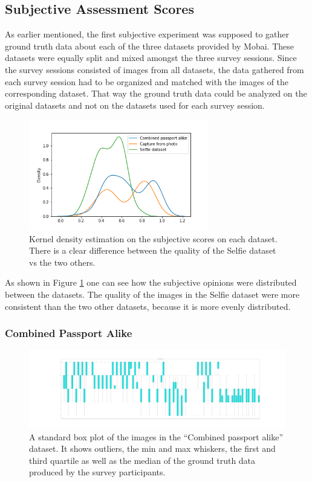 \subsection{Subjective Assessment Scores}
As earlier mentioned, the first subjective experiment was supposed to gather ground truth data about each of the three datasets provided by Mobai. These datasets were equally split and mixed amongst the three survey sessions. Since the survey sessions consisted of images from all datasets, the data gathered from each survey session had to be organized and matched with the images of the corresponding dataset. That way the ground truth data could be analyzed on the original datasets and not on the datasets used for each survey session.

\begin{figure}[h]
    \centering
    \includegraphics[width=0.7\textwidth]{figures/KernelPlots.png}
    \caption{Kernel density estimation on the subjective scores on each dataset. There is a clear difference between the quality of the Selfie dataset vs the two others.}
    \label{fig:kerneldensity}
\end{figure}

As shown in Figure \ref{fig:kerneldensity} one can see how the subjective opinions were distributed between the datasets. The quality of the images in the Selfie dataset were more consistent than the two other datasets, because it is more evenly distributed.   


\subsubsection*{Combined Passport Alike}


\begin{figure}[h]
    \centering
    \includegraphics[width=1.0\textwidth]{figures/boxplot1.png}
    \caption{A standard box plot of the images in the ``Combined passport alike'' dataset. It shows outliers, the min and max whiskers, the first and third quartile as well as the median of the ground truth data produced by the survey participants.}
    \label{fig:boxplot1}
\end{figure}

